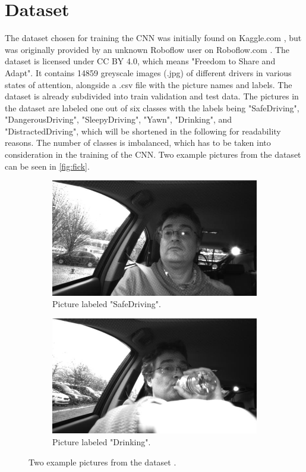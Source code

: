 \section{Dataset}
The dataset chosen for training the CNN was initially found on Kaggle.com \cite{kag_set}, but was originally provided by an unknown Roboflow user on Roboflow.com \cite{rob_set}.
The dataset is licensed under CC BY 4.0, which means "Freedom to Share and Adapt".
It contains 14859 greyscale images (.jpg) of different drivers in various states of attention, alongside a .csv file with the picture names and labels. The dataset is already subdivided into train validation and test data. The pictures in the dataset are labeled one out of six classes with the labels being "SafeDriving", "DangerousDriving", "SleepyDriving", "Yawn", "Drinking", and "DistractedDriving", which will be shortened in the following for readability reasons. The number of classes is imbalanced, which has to be taken into consideration in the training of the CNN. Two example pictures from the dataset can be seen in \autoref{fig:fick}.
\begin{figure}[H]
    \centering
    \begin{subfigure}[b]{0.47\textwidth}
        \centering
        \includegraphics[width = \textwidth]{content/safe.jpg}
        \caption{Picture labeled "SafeDriving".}
        \label{fig:ggf1}
    \end{subfigure}
    \hfill
    \begin{subfigure}[b]{0.47\textwidth}
        \centering
        \includegraphics[width = \textwidth]{content/drinking.jpg}
        \caption{Picture labeled "Drinking".}
        \label{fig:ggf2}
    \end{subfigure}
    \caption{Two example pictures from the dataset \cite{rob_set}.}
    \label{fig:fick}
\end{figure}
